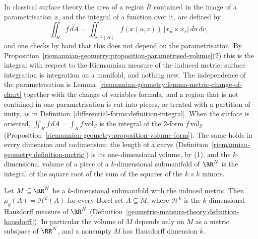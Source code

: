 \begin{remark}\label{riemannian-geometry:remark-surface-integrals}
In classical surface theory \cite[Chapter 2]{do-carmo-curves-surfaces} the area of a region $R$ contained in the image of a parametrisation $x$, and the integral of a
function over it, are defined by
\[
\iint_Rf\,dA = \iint_{x^{-1}(R)}f(x(u, v))\,|x_u \times x_v|\,du\,dv,
\]
and one checks by hand that this does not depend on the parametrisation. By Proposition~\ref{riemannian-geometry:proposition-parametrised-volume}(2) this is the
integral with respect to the Riemannian measure of the induced metric: surface integration is integration on a manifold, and nothing new. The independence of the
parametrisation is Lemma~\ref{riemannian-geometry:lemma-metric-change-of-chart} together with the change of variables formula, and a region that is not contained in
one parametrisation is cut into pieces, or treated with a partition of unity, as in Definition~\ref{differential-forms:definition-integral}. When the surface is oriented,
$\iint_Rf\,dA = \int_Rf\,\mathrm{vol}_S$ is the integral of the $2$-form $f\,\mathrm{vol}_S$ (Proposition~\ref{riemannian-geometry:proposition-volume-form}). The same
holds in every dimension and codimension: the length of a curve (Definition~\ref{riemannian-geometry:definition-metric}) is its one-dimensional volume, by (1), and the
$k$-dimensional volume of a piece of a $k$-dimensional submanifold of $\RR^N$ is the integral of the square root of the sum of the squares of the $k \times k$ minors.
\end{remark}


\begin{proposition}\label{riemannian-geometry:proposition-hausdorff-measure}
Let $M \subseteq \RR^N$ be a $k$-dimensional submanifold with the induced metric. Then $\mu_g(A) = \mathcal{H}^k(A)$ for every Borel set $A \subseteq M$, where $\mathcal{H}^k$ is the
$k$-dimensional Hausdorff measure of $\RR^N$ (Definition~\ref{geometric-measure-theory:definition-hausdorff}). In particular the volume of $M$ depends only on $M$ as a metric subspace of $\RR^N$, and a
nonempty $M$ has Hausdorff dimension $k$.
\end{proposition}

